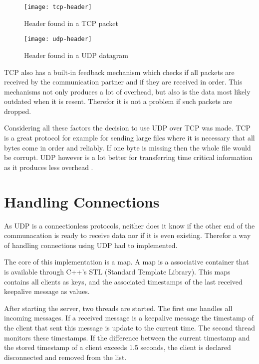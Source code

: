 \begin{figure}[H]
    \centering
    \texttt{[image: tcp-header]}
    \caption{Header found in a TCP packet}
    \label{fig:tcp-header}
\end{figure}

\begin{figure}[H]
    \centering
    \texttt{[image: udp-header]}
    \caption{Header found in a UDP datagram}
    \label{fig:udp-header}
\end{figure}

TCP also has a built-in feedback mechanism which checks if all packets are received by the communication partner and if they are received in order. This mechanisms not only produces a lot of overhead, but also is the data
most likely outdated when it is resent. Therefor it is not a problem if such packets are dropped.

Considering all these factors the decision to use UDP over TCP was made. TCP is a great protocol for example for sending large files where it is necessary that all bytes come in order and reliably. If one byte is missing
then the whole file would be corrupt. UDP however is a lot better for transferring time critical information as it produces less overhead \cite{TCPUDPRTlifesize}.

\section {Handling Connections}

As UDP is a connectionless protocols, neither does it know if the other end of the communacation is ready to receive data nor if it is even existing. Therefor a way of handling connections using UDP had to implemented.

The core of this implementation is a map. A map is a associative container that is available through C++'s STL (Standard Template Library). This maps contains all clients as keys, and the associated timestamps of the last
received keepalive message as values.

After starting the server, two threads are started. The first one handles all incoming messages. If a received message is a keepalive message the timestamp of the client that sent this message is update
to the current time. The second thread monitors these timestamps. If the difference between the current timestamp and the stored timestamp of a client exceeds 1.5 seconds, the client is declared disconnected and removed
from the list.

